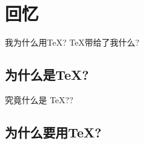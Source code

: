 \section{回忆}
我为什么用\TeX{}? \TeX{}带给了我什么?

\subsection{为什么是\TeX{}?}
究竟什么是 \TeX{}??

\subsection{为什么要用\TeX{}?}
